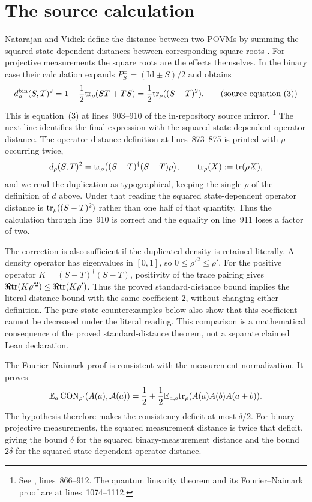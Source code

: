 \documentclass[11pt]{article}
\newcommand{\dbin}{d^{\mathrm{bin}}}
\newcommand{\Id}{\mathrm{Id}}
\begin{document}
\section{The source calculation}

Natarajan and Vidick define the distance between two POVMs by summing the
squared state-dependent distances between corresponding square roots
\cite[Section~3.1]{Natarajan2017Linearity}.  For projective measurements the
square roots are the effects themselves.  In the binary case their calculation
expands $P_S^\pm=(\Id\pm S)/2$ and obtains
\[
  \dbin_\rho(S,T)^2
    = 1-\frac12\tr_\rho(ST+TS)
    = \frac12\tr_\rho((S-T)^2).
  \tag{source equation (3)}
\]
This is equation~(3) at lines~903--910 of the in-repository source mirror.%
\footnote{See
, lines~866--912.  The quantum
linearity theorem and its Fourier--Naimark proof are at lines~1074--1112.}
The next line identifies the final expression with the squared state-dependent
operator distance.  The operator-distance definition at lines~873--875 is
printed with $\rho$ occurring twice,
\[
  d_\rho(S,T)^2 = \mathrm{tr}_\rho\big((S-T)^\dagger(S-T)\rho\big),
  \qquad \mathrm{tr}_\rho(X) := \mathrm{tr}(\rho X),
\]
and we read the duplication as typographical, keeping the single $\rho$ of the
definition of $d$ above.  Under that reading the squared state-dependent
operator distance is $\mathrm{tr}_\rho((S-T)^2)$ rather than one half of that
quantity.  Thus the calculation through line~910 is correct and the equality
on line~911 loses a factor of two.

The correction is also sufficient if the duplicated density is retained
literally. A density operator has eigenvalues in $[0,1]$, so
$0\leq\rho'^2\leq\rho'$. For the positive operator
$K=(S-T)^\dagger(S-T)$, positivity of the trace pairing gives
$\Re\mathrm{tr}(K\rho'^2)\leq\Re\mathrm{tr}(K\rho')$. Thus the proved standard-distance
bound implies the literal-distance bound with the same coefficient $2$,
without changing either definition. The pure-state counterexamples below
also show that this coefficient cannot be decreased under the literal
reading. This comparison is a mathematical consequence of the proved
standard-distance theorem, not a separate claimed Lean declaration.

The Fourier--Naimark proof is consistent with the measurement normalization.
It proves
\[
  \mathbb E_a\operatorname{CON}_{\rho'}(A(a),\mathcal A(a))
  = \frac12+\frac12\mathbb E_{a,b}
       \mathrm{tr}_\rho(A(a)A(b)A(a+b)).
\]
The hypothesis therefore makes the consistency deficit at most $\delta/2$.
For binary projective measurements, the squared measurement distance is twice
that deficit, giving the bound $\delta$ for the squared binary-measurement
distance and the bound $2\delta$ for the squared state-dependent operator
distance.
\end{document}
